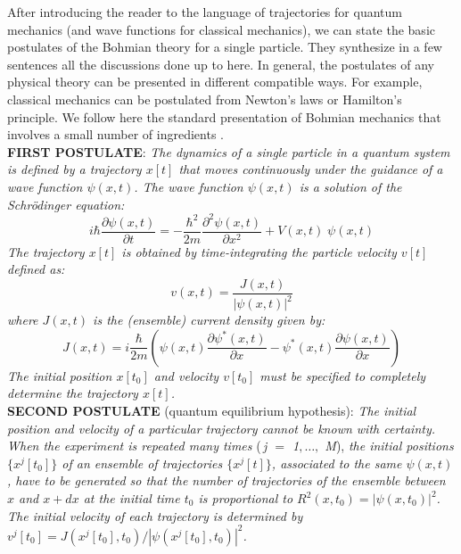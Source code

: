 \documentclass[onecolumn,nofootinbib, secnumarabic, amsmath, nobibnotes,11pt,aps,pra]{revtex4-1}
\begin{document}
After introducing the reader to the language of trajectories for
quantum mechanics (and wave functions for classical mechanics), we
can state the basic postulates of the Bohmian theory  for a single particle. They synthesize in
a few sentences all the discussions done up to here. In general, the
postulates of any physical theory can be presented in different
compatible ways. For example, classical mechanics can be postulated
from Newton's laws or Hamilton's principle. We follow here the
standard presentation of Bohmian mechanics that involves a small
number of ingredients
\cite{om.Holand1993,om.Valentini2006,om.appraisal,om.Durrllibre}.\\

\noindent\textbf{FIRST POSTULATE}: \textit{The dynamics of a single particle in a quantum system is defined by a trajectory $x[t]$ that moves continuously under the guidance of a wave function $\psi(x,t)$.
The wave function $\psi(x,t)$ is a solution of the Schr\"odinger equation:}
\begin{equation*}
i \hbar \frac{\partial \psi(x,t)} {\partial t} = -\frac {\hbar^2} {2m} \frac{ {\partial}^2 \psi(x,t)} {\partial x^2} + V(x,t) \;\psi(x,t)
\end{equation*}
\textit{The trajectory $x[t]$ is obtained by time-integrating the particle velocity $v[t]$ defined as:}
\begin{equation*}
v(x,t) = \frac{J(x,t)} {|\psi(x,t)|^2}
\end{equation*}
\textit{where $J(x,t)$ is the (ensemble) current density given by:}
\begin{equation*}
J(x,t) = i \frac {\hbar} {2 m} \left(\psi(x,t) \frac {\partial \psi^{*}(x,t)} {\partial x}- \psi^{*}(x,t) \frac {\partial \psi(x,t)} {\partial x} \right)
\end{equation*}
\textit{The initial position $x[t_0]$ and velocity $v[t_0]$ must be specified to completely determine the trajectory $x[t]$.} \\

\noindent\textbf{SECOND POSTULATE} (quantum equilibrium hypothesis): \textit{The initial position and velocity of a particular trajectory cannot be known with certainty. When the experiment is repeated many times}  (\textit{\,j $=$ 1$,\ldots,$ M}), \textit{the initial positions $\{ x^j[t_0] \}$ of an ensemble of trajectories $\{x^j[t] \}$, associated to the same $\psi(x,t)$, have to be generated so that the number of trajectories of the ensemble between $x$ and $x + dx$ at the initial time $t_0$ is proportional to $R^2(x,t_0) = |\psi(x,t_0)|^2$. The initial velocity of each trajectory is determined by $v^j[t_0] = J(x^j[t_0],t_0)/|\psi(x^j[t_0],t_0)|^2$.}\\
\end{document}
